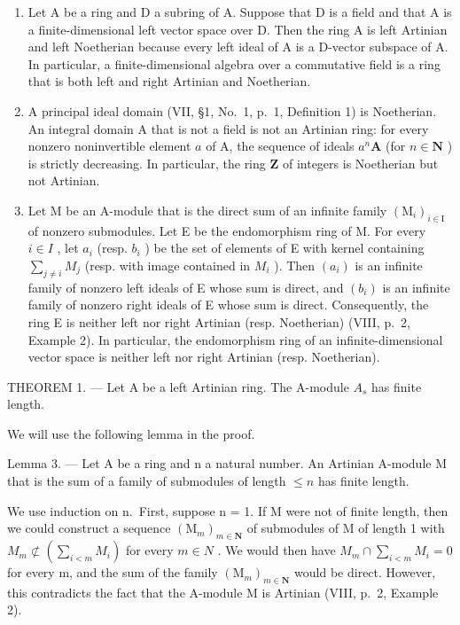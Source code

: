 \begin{enumerate}
\def\labelenumi{\arabic{enumi})}
\setcounter{enumi}{1}
\item
  Let A be a ring and D a subring of A. Suppose that D is a field and that A is a finite-dimensional left vector space over D. Then the ring A is left Artinian and left Noetherian because every left ideal of A is a D-vector subspace of A. In particular, a finite-dimensional algebra over a commutative field is a ring that is both left and right Artinian and Noetherian.
\item
  A principal ideal domain (VII, §1, No.~1, p.~1, Definition 1) is Noetherian. An integral domain A that is not a field is not an Artinian ring: for every nonzero noninvertible element \(a\) of A, the sequence of ideals \(a^n\mathbf{A}\) (for \(n \in \mathbf{N}\) ) is strictly decreasing. In particular, the ring \(\mathbf{Z}\) of integers is Noetherian but not Artinian.
\item
  Let M be an A-module that is the direct sum of an infinite family \((\mathrm{M}_{i})_{i\in\mathrm{I}}\) of nonzero submodules. Let E be the endomorphism ring of M. For every \(i\in I\) , let \(a_{i}\) (resp. \(b_{i}\) ) be the set of elements of E with kernel containing \(\sum_{j\neq i}M_{j}\) (resp. with image contained in \(M_{i}\) ). Then \((a_{i})\) is an infinite family of nonzero left ideals of E whose sum is direct, and \((b_{i})\) is an infinite family of nonzero right ideals of E whose sum is direct. Consequently, the ring E is neither left nor right Artinian (resp. Noetherian) (VIII, p.~2, Example 2). In particular, the endomorphism ring of an infinite-dimensional vector space is neither left nor right Artinian (resp. Noetherian).
\end{enumerate}

THEOREM 1. --- Let A be a left Artinian ring. The A-module \(A_{s}\) has finite length.

We will use the following lemma in the proof.

Lemma 3. --- Let A be a ring and n a natural number. An Artinian A-module M that is the sum of a family of submodules of length \(\leqslant n\) has finite length.

We use induction on n.~First, suppose n = 1. If M were not of finite length, then we could construct a sequence \((\mathrm{M}_{m})_{m \in \mathbf{N}}\) of submodules of M of length 1 with \(M_{m} \not\subset (\sum_{i < m} M_{i})\) for every \(m \in N\) . We would then have \(M_{m} \cap \sum_{i < m} M_{i} = 0\) for every m, and the sum of the family \((\mathrm{M}_{m})_{m \in \mathbf{N}}\) would be direct. However, this contradicts the fact that the A-module M is Artinian (VIII, p.~2, Example 2).

